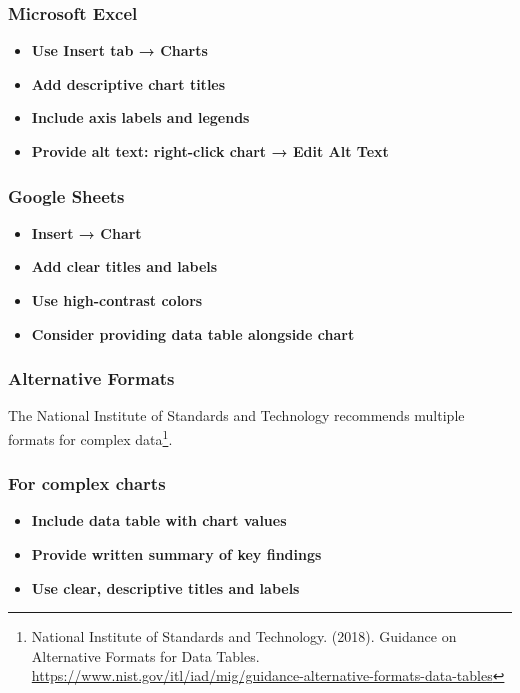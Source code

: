 \subsubsection{Microsoft Excel}
\vspace{1em}
\begin{itemize}
\item \textbf{Use Insert tab → Charts}
\item \textbf{Add descriptive chart titles}
\item \textbf{Include axis labels and legends}
\item \textbf{Provide alt text: right-click chart → Edit Alt Text}
\end{itemize}
\vspace{1em}

\subsubsection{Google Sheets}
\vspace{1em}
\begin{itemize}
\item \textbf{Insert → Chart}
\item \textbf{Add clear titles and labels}
\item \textbf{Use high-contrast colors}
\item \textbf{Consider providing data table alongside chart}
\end{itemize}
\vspace{1em}

\subsubsection{Alternative Formats}
The National Institute of Standards and Technology recommends multiple formats for complex data\footnote{National Institute of Standards and Technology. (2018). Guidance on Alternative Formats for Data Tables. \url{https://www.nist.gov/itl/iad/mig/guidance-alternative-formats-data-tables}}.

\subsubsection{For complex charts}
\vspace{1em}
\begin{itemize}
\item \textbf{Include data table with chart values}
\item \textbf{Provide written summary of key findings}
\item \textbf{Use clear, descriptive titles and labels}
\end{itemize}
\vspace{1em}

